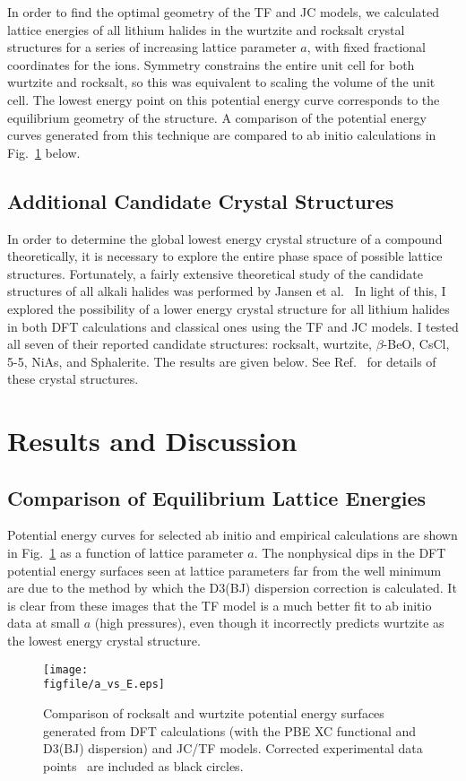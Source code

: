 \documentclass[titlepage,11pt]{article}
\newcommand{\figfile}{C:/Users/Hayden/Documents/Patey_Lab/ThesisCodeBase/Manuscript_1.0/figures}
\begin{document}
In order to find the optimal geometry of the TF and JC models, we calculated lattice energies of all lithium halides in the wurtzite and rocksalt crystal structures for a series of increasing lattice parameter $a$, with fixed fractional coordinates for the ions. Symmetry constrains the entire unit cell for both wurtzite and rocksalt, so this was equivalent to scaling the volume of the unit cell. The lowest energy point on this potential energy curve corresponds to the equilibrium geometry of the structure. A comparison of the potential energy curves generated from this technique are compared to ab initio calculations in Fig.~\ref{fig:PES} below.

\subsection{Additional Candidate Crystal Structures}

In order to determine the global lowest energy crystal structure of a compound theoretically, it is necessary to explore the entire phase space of possible lattice structures. Fortunately, a fairly extensive theoretical study of the candidate structures of all alkali halides was performed by Jansen et al.~\cite{Cancarevic2008} In light of this, I explored the possibility of a lower energy crystal structure for all lithium halides in both DFT calculations and classical ones using the TF and JC models. I tested all seven of their reported candidate structures: rocksalt, wurtzite, $\beta$-BeO, CsCl, 5-5, NiAs, and Sphalerite. The results are given below. See Ref.~ for details of these crystal structures.

\section{Results and Discussion}
%
\subsection{Comparison of Equilibrium Lattice Energies}
%
Potential energy curves for selected ab initio and empirical calculations are shown in Fig.~\ref{fig:PES} as a function of lattice parameter $a$. The nonphysical dips in the DFT potential energy surfaces seen at lattice parameters far from the well minimum are due to the method by which the D3(BJ) dispersion correction is calculated. It is clear from these images that the TF model is a much better fit to ab initio data at small $a$ (high pressures), even though it incorrectly predicts wurtzite as the lowest energy crystal structure.
%
\begin{figure}
	\texttt{[image: \\figfile/a\_vs\_E.eps]}
	\caption{\label{fig:PES} Comparison of rocksalt and wurtzite potential energy surfaces generated from DFT calculations (with the PBE XC functional and D3(BJ) dispersion) and JC/TF models. Corrected experimental data points~\cite{sirdeshmukh2013alkali} are included as black circles.}
\end{figure}
\end{document}
